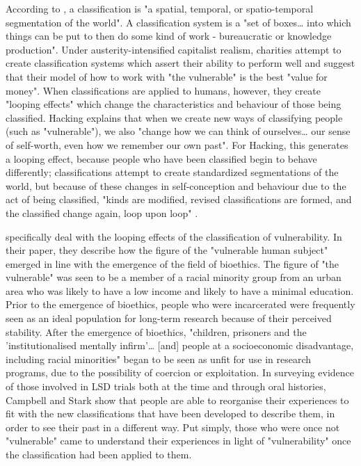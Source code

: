 According to \citet[110]{bowker_sorting_1999}, a classification is "a spatial, temporal, or spatio-temporal segmentation of the world". A classification system is a "set of boxes\ldots{} into which things can be put to then do some kind of work - bureaucratic or knowledge production". Under austerity-intensified capitalist realism, charities attempt to create classification systems which assert their ability to perform well and suggest that their model of how to work with "the vulnerable" is the best "value for money". When  classifications are applied to humans, however, they create "looping effects" \citep{hacking_looping_1996} which change the characteristics and behaviour of those being classified. Hacking  explains that when we create new ways of classifying people (such as "vulnerable"), we also "change how we can think of ourselves\ldots{} our sense of self-worth, even how we remember our own past". For Hacking, this generates a looping effect, because people who have been classified begin to behave differently; classifications attempt to create standardized segmentations of the world, but because of these changes in self-conception and behaviour due to the act of being classified, "kinds are modified, revised classifications are formed, and the
classified change again, loop upon loop" \citep[370]{hacking_looping_1996}.

\citet{campbell_making_2015} specifically deal with the looping effects of the classification of vulnerability. In their paper, they describe how the figure of the "vulnerable human subject" emerged in line with the
emergence of the field of bioethics. The figure of "the vulnerable" was seen to be a member of a racial minority group from an urban area who was likely to have a low income and likely to have a minimal education. Prior to the emergence of bioethics, people who were incarcerated were frequently seen as an ideal population for long-term research because of their perceived stability. After the emergence of bioethics, "children, prisoners and the 'institutionalised mentally infirm'\ldots{} [and] people at a socioeconomic disadvantage, including racial minorities" \citep[16]{campbell_making_2015} began to be seen as unfit for use in research programs, due to the possibility of coercion or exploitation. In surveying evidence of those involved in LSD trials both at the time and through oral histories, Campbell and Stark show that people are able to reorganise their experiences to fit with the new classifications that have been developed to describe them, in order to see their past in a different way. Put simply, those who were once not "vulnerable" came to understand their experiences in light of "vulnerability" once the classification had been applied to them.


